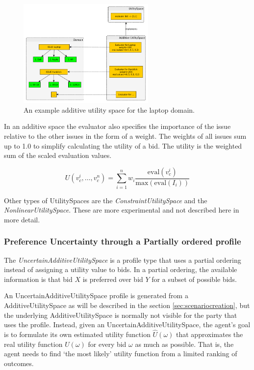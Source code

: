 \documentclass[]{article}
\begin{document}
\begin{figure}[htb]
	\centering
	\includegraphics[width=0.6\textwidth]{media/utilspace.png}
	\caption{An example additive utility space for the laptop domain.}\label{Fig:utilspace}
\end{figure}
 
In an additive space the evaluator also specifies the importance of the issue relative to the other issues in the form of a weight. The weights of all issues sum up to 1.0 to simplify calculating the utility of a bid. The utility is the weighted sum of the scaled evaluation values.

\begin{equation}
	U(v^i_{c},\ldots,v^n_{c}) = \sum_{i=1}^{n} w_i \dfrac{\text{eval}(v^i_{c})}{\text{max}(\text{eval}(I_i))}
	\label{eqn:Utility}
\end{equation}

Other types of UtilitySpaces are the \textit{ConstraintUtilitySpace} and the \textit{NonlinearUtilitySpace}. These are more experimental and not described here in more detail.

\subsubsection{Preference Uncertainty through a Partially ordered profile}\label{sec:partialordering}

The \textit{UncertainAdditiveUtilitySpace} is a profile type that uses a partial ordering instead of assigning a utility value to bids. In a partial ordering, the available information is that bid $X$ is preferred over bid $Y$ for a subset of possible bids. 

An UncertainAdditiveUtilitySpace profile is generated from a AdditiveUtilitySpace as will be described in the section \ref{sec:scenariocreation}, but the underlying AdditiveUtilitySpace is normally not visible for the party that uses the profile. Instead, given an UncertainAdditiveUtilitySpace, the agent's goal is to formulate its own estimated utility function $ \hat{U}(\omega) $ that approximates the real utility function $ U(\omega) $ for every bid $\omega$ as much as possible. That is, the agent needs to find `the most likely' utility function from a limited ranking of outcomes.
\end{document}
